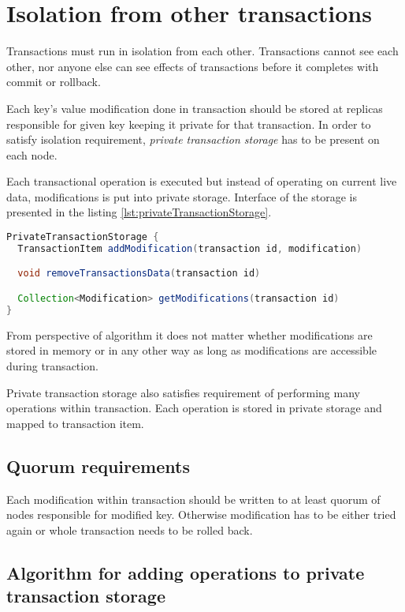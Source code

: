 
\section{Isolation from other transactions}
Transactions must run in isolation from each other. Transactions cannot see each other, nor anyone else can see effects of transactions before it completes with commit or rollback.

Each key's value modification done in transaction should be stored at replicas responsible for given key keeping it private for that transaction. In order to satisfy isolation requirement, \emph{private transaction storage} has to be present on each node.

Each transactional operation is executed but instead of operating on current live data, modifications is put into private storage. Interface of the storage is presented in the listing \ref{lst:privateTransactionStorage}.

\begin{lstlisting}[language=Java,style=outcode,label={lst:privateTransactionStorage},caption={API of private transaction storage}]
PrivateTransactionStorage {
  TransactionItem addModification(transaction id, modification)

  void removeTransactionsData(transaction id)

  Collection<Modification> getModifications(transaction id)        
}

\end{lstlisting}


From perspective of algorithm it does not matter whether modifications are stored in memory or in any other way as long as modifications are accessible during transaction.

Private transaction storage also satisfies requirement of performing many operations within transaction. Each operation is stored in private storage and mapped to transaction item.


\subsection{Quorum requirements}
Each modification within transaction should be written to at least quorum of nodes responsible for modified key. Otherwise modification has to be either tried again or whole transaction needs to be rolled back.

\subsection{Algorithm for adding operations to private transaction storage}

